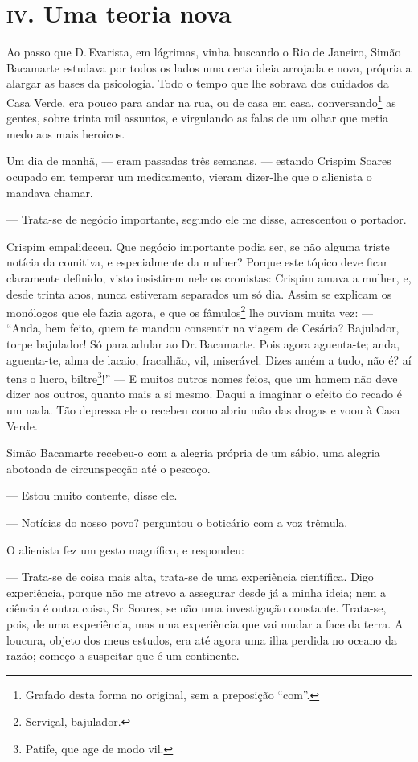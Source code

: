\chapter{\textsc{iv}. Uma teoria nova }

Ao passo que D.\,Evarista, em lágrimas, vinha buscando o Rio de Janeiro,
Simão Bacamarte estudava por todos os lados uma certa ideia arrojada e
nova, própria a alargar as bases da psicologia. Todo o tempo que lhe
sobrava dos cuidados da Casa Verde, era pouco para andar na rua, ou de
casa em casa, conversando\footnote{Grafado desta forma no original, sem
  a preposição ``com''.} as gentes, sobre trinta mil assuntos, e
virgulando as falas de um olhar que metia medo aos mais heroicos.

Um dia de manhã, --- eram passadas três semanas, --- estando Crispim
Soares ocupado em temperar um medicamento, vieram dizer-lhe que o
alienista o mandava chamar.

--- Trata-se de negócio importante, segundo ele me disse, acrescentou o
portador.

Crispim empalideceu. Que negócio importante podia ser, se não alguma
triste notícia da comitiva, e especialmente da mulher? Porque este
tópico deve ficar claramente definido, visto insistirem nele os
cronistas: Crispim amava a mulher, e, desde trinta anos, nunca estiveram
separados um só dia. Assim se explicam os monólogos que ele fazia agora,
e que os fâmulos\footnote{Serviçal, bajulador.} lhe ouviam muita vez:
--- ``Anda, bem feito, quem te mandou consentir na viagem de Cesária?
Bajulador, torpe bajulador! Só para adular ao Dr.\,Bacamarte. Pois agora
aguenta-te; anda, aguenta-te, alma de lacaio, fracalhão, vil, miserável.
Dizes amém a tudo, não é? aí tens o lucro, biltre\footnote{Patife, que
  age de modo vil.}!'' --- E muitos outros nomes feios, que um homem não
deve dizer aos outros, quanto mais a si mesmo. Daqui a imaginar o efeito
do recado é um nada. Tão depressa ele o recebeu como abriu mão das
drogas e voou à Casa Verde.

Simão Bacamarte recebeu-o com a alegria própria de um sábio, uma alegria
abotoada de circunspecção até o pescoço.

--- Estou muito contente, disse ele.

--- Notícias do nosso povo? perguntou o boticário com a voz trêmula.

O alienista fez um gesto magnífico, e respondeu:

--- Trata-se de coisa mais alta, trata-se de uma experiência científica.
Digo experiência, porque não me atrevo a assegurar desde já a minha
ideia; nem a ciência é outra coisa, Sr.\,Soares, se não uma investigação
constante. Trata-se, pois, de uma experiência, mas uma experiência que
vai mudar a face da terra. A loucura, objeto dos meus estudos, era até
agora uma ilha perdida no oceano da razão; começo a suspeitar que é um
continente.

